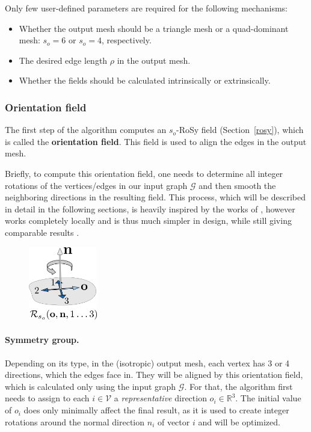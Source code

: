 \documentclass{ACGSeminar}
\begin{document}
Only few user-defined parameters are required for the following mechanisms:
\begin{itemize}
	\item	Whether the output mesh should be a triangle mesh or a quad-dominant mesh: $s_o = 6$ or $s_o = 4$, respectively.
	\item	The desired edge length $\rho$ in the output mesh.
	\item	Whether the fields should be calculated intrinsically or extrinsically.
\end{itemize}

\subsubsection{Orientation field}\label{orientation-field}
The first step of the algorithm computes an $s_o$-RoSy field (Section~\ref{rosy}), which is called the \textbf{orientation field}. This field is used to align the edges in the output mesh.\bigskip

Briefly, to compute this orientation field, one needs to determine all integer rotations of the vertices/edges in our input graph $\mathcal{G}$ and then smooth the neighboring directions in the resulting field. This process, which will be described in detail in the following sections, is heavily inspired by the works of \cite{bommes2009mixed,ray2008n}, however works completely locally and is thus much simpler in design, while still giving comparable results \cite{jakob2015instant}.

\begin{figure}
	\includegraphics[width=3cm]{img/integer-rotation.png}\par
	\label{fig:integer-rotation}
\end{figure}

\paragraph{Symmetry group.}
Depending on its type, in the (isotropic) output mesh, each vertex has 3 or 4 directions, which the edges face in. They will be aligned by this orientation field, which is calculated only using the input graph $\mathcal{G}$. For that, the algorithm first needs to assign to each $i \in \mathcal{V}$ a \textit{representative} direction $o_i \in \mathbb{R}^3$. The initial value of $o_i$ does only minimally affect the final result, as it is used to create integer rotations around the normal direction $n_i$ of vector $i$ and will be optimized.\bigskip
\end{document}
